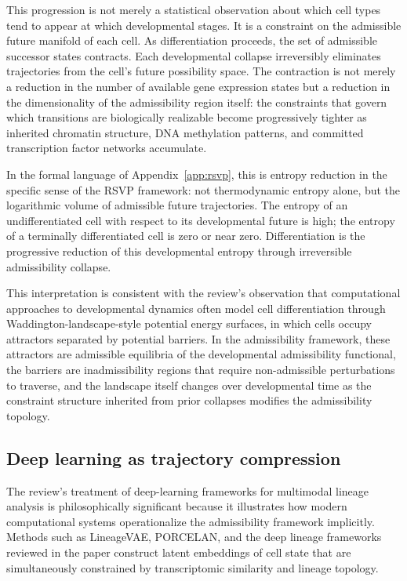 \documentclass[12pt, a4paper]{article}
\theoremstyle{plain}
\theoremstyle{definition}
\theoremstyle{remark}
\begin{document}
This progression is not merely a statistical observation about which cell
types tend to appear at which developmental stages.
It is a constraint on the admissible future manifold of each cell.
As differentiation proceeds, the set of admissible successor states
contracts.
Each developmental collapse irreversibly eliminates trajectories from the
cell's future possibility space.
The contraction is not merely a reduction in the number of available gene
expression states but a reduction in the dimensionality of the admissibility
region itself: the constraints that govern which transitions are biologically
realizable become progressively tighter as inherited chromatin structure,
DNA methylation patterns, and committed transcription factor networks
accumulate.

In the formal language of Appendix~\ref{app:rsvp}, this is entropy reduction
in the specific sense of the RSVP framework: not thermodynamic entropy alone,
but the logarithmic volume of admissible future trajectories.
The entropy of an undifferentiated cell with respect to its developmental
future is high; the entropy of a terminally differentiated cell is zero or
near zero.
Differentiation is the progressive reduction of this developmental entropy
through irreversible admissibility collapse.

This interpretation is consistent with the review's observation that
computational approaches to developmental dynamics often model cell
differentiation through Waddington-landscape-style potential energy
surfaces, in which cells occupy attractors separated by potential barriers.
In the admissibility framework, these attractors are admissible equilibria
of the developmental admissibility functional, the barriers are
inadmissibility regions that require non-admissible perturbations to
traverse, and the landscape itself changes over developmental time as
the constraint structure inherited from prior collapses modifies the
admissibility topology.

\subsection{Deep learning as trajectory compression}

The review's treatment of deep-learning frameworks for multimodal lineage
analysis is philosophically significant because it illustrates how modern
computational systems operationalize the admissibility framework
implicitly.
Methods such as LineageVAE, PORCELAN, and the deep lineage frameworks
reviewed in the paper construct latent embeddings of cell state that are
simultaneously constrained by transcriptomic similarity and lineage
topology.
\end{document}
